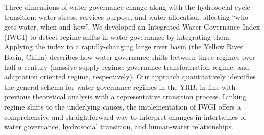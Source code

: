 Three dimensions of water governance change along with the hydrosocial cycle transition: water stress, services purpose, and water allocation, affecting ``who gets water, when and how''. We developed an Integrated Water Governance Index (IWGI) to detect regime shifts in water governance by integrating them. Applying the index to a rapidly-changing large river basin (the Yellow River Basin, China) describes how water governance shifts between three regimes over half a century (massive supply regime; governance transformation regime; and adaptation oriented regime, respectively). Our approach quantitatively identifies the general schema for water governance regimes in the YRB, in line with previous theoretical analysis with a representative transition process. Linking regime shifts to the underlying causes, the implementation of IWGI offers a comprehensive and straightforward way to interpret changes in intertwines of water governance, hydrosocial transition, and human-water relationships.
